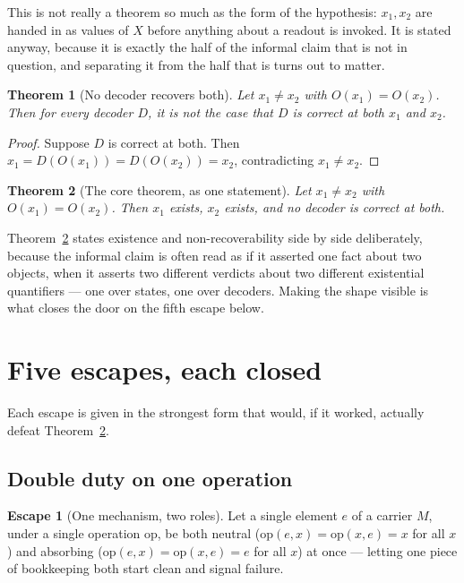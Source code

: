 \documentclass[10pt,twocolumn]{article}
\theoremstyle{plain}
\newtheorem{theorem}{Theorem}
\theoremstyle{definition}
\newtheorem{escape}{Escape}
\theoremstyle{remark}
\begin{document}
This is not really a theorem so much as the form of the hypothesis: $x_1, x_2$ are handed in as values of $X$ before anything about a readout is invoked. It is stated anyway, because it is exactly the half of the informal claim that is not in question, and separating it from the half that is turns out to matter.

\begin{theorem}[No decoder recovers both]\label{thm:core}
Let $x_1 \neq x_2$ with $O(x_1) = O(x_2)$. Then for every decoder $D$, it is not the case that $D$ is correct at both $x_1$ and $x_2$.
\end{theorem}

\begin{proof}
Suppose $D$ is correct at both. Then $x_1 = D(O(x_1)) = D(O(x_2)) = x_2$, contradicting $x_1 \neq x_2$.
\end{proof}

\begin{theorem}[The core theorem, as one statement]\label{thm:combined}
Let $x_1 \neq x_2$ with $O(x_1) = O(x_2)$. Then $x_1$ exists, $x_2$ exists, and no decoder is correct at both.
\end{theorem}

Theorem~\ref{thm:combined} states existence and non-recoverability side by side deliberately, because the informal claim is often read as if it asserted one fact about two objects, when it asserts two different verdicts about two different existential quantifiers --- one over states, one over decoders. Making the shape visible is what closes the door on the fifth escape below.

\section{Five escapes, each closed}\label{sec:escapes}

Each escape is given in the strongest form that would, if it worked, actually defeat Theorem~\ref{thm:combined}.

\subsection{Double duty on one operation}

\begin{escape}[One mechanism, two roles]
Let a single element $e$ of a carrier $M$, under a single operation $\mathrm{op}$, be both neutral ($\mathrm{op}(e,x)=\mathrm{op}(x,e)=x$ for all $x$) and absorbing ($\mathrm{op}(e,x)=\mathrm{op}(x,e)=e$ for all $x$) at once --- letting one piece of bookkeeping both start clean and signal failure.
\end{escape}
\end{document}

